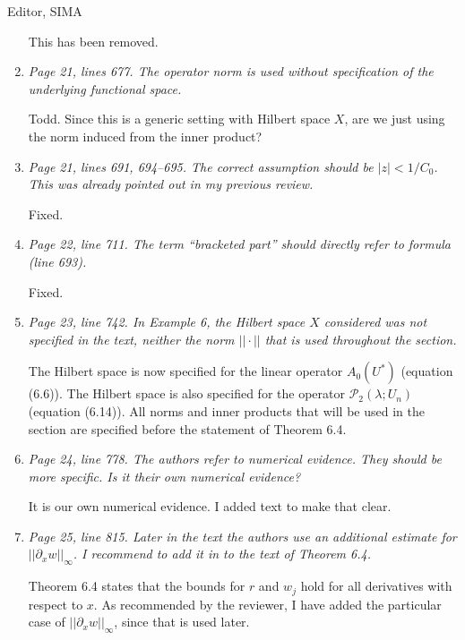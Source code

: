 \documentclass[11pt]{letter}
\begin{document}
\begin{letter}{Editor, SIMA}
\begin{enumerate}
This has been removed.

\item \emph{Page 21, lines 677. The operator norm is used without specification of the underlying functional space.}
\vspace{4mm}

Todd. Since this is a generic setting with Hilbert space $X$, are we just using the norm induced from the inner product?

\item \emph{Page 21, lines 691, 694–695. The correct assumption should be $|z| < 1/C_0$. This was already pointed out in my previous review.}
\vspace{4mm}

Fixed.

\item \emph{Page 22, line 711. The term ``bracketed part'' should directly refer to formula (line 693).}
\vspace{4mm}

Fixed.

\item \emph{Page 23, line 742. In Example 6, the Hilbert space $X$ considered was not specified in the text, neither the norm $||\cdot||$ that is used throughout the section.}
\vspace{4mm}

The Hilbert space is now specified for the linear operator $A_0(U^*)$ (equation (6.6)). The Hilbert space is also specified for the operator $\mathcal{P}_2(\lambda; U_n)$ (equation (6.14)). All norms and inner products that will be used in the section are specified before the statement of Theorem 6.4.

\item \emph{Page 24, line 778. The authors refer to numerical evidence. They should be more specific. Is it their own numerical evidence?}
\vspace{4mm}

It is our own numerical evidence. I added text to make that clear.

\item \emph{Page 25, line 815. Later in the text the authors use an additional estimate for $||\partial_x w||_\infty$. I recommend to add it in to the text of Theorem 6.4.}
\vspace{4mm}

Theorem 6.4 states that the bounds for $r$ and $w_j$ hold for all derivatives with respect to $x$. As recommended by the reviewer, I have added the particular case of $||\partial_x w||_\infty$, since that is used later.


\end{enumerate}
\end{letter}
\end{document}
